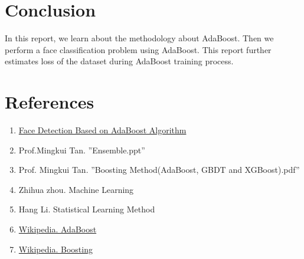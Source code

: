 \documentclass[journal, a4paper]{IEEEtran}
\begin{document}
\section{Conclusion}
In this report, we learn about the methodology about AdaBoost. Then we perform a face classification problem using AdaBoost. This report further estimates loss of the dataset during AdaBoost training process.

\section{References}
\begin{enumerate}
\item \href{https://www.zybuluo.com/liushiya/note/1305570}{Face Detection Based on AdaBoost Algorithm}
\item Prof.Mingkui Tan. ''Ensemble.ppt''
\item Prof. Mingkui Tan. ''Boosting Method(AdaBoost, GBDT and XGBoost).pdf''
\item Zhihua zhou. Machine Learning
\item Hang Li. Statistical Learning Method
\item \href{https://en.wikipedia.org/wiki/AdaBoost}{Wikipedia. AdaBoost}
\item \href{https://en.wikipedia.org/wiki/Boosting_(machine_learning)}{Wikipedia. Boosting} \label{href:Boosting}
\end{enumerate}

\newpage
\end{document}
